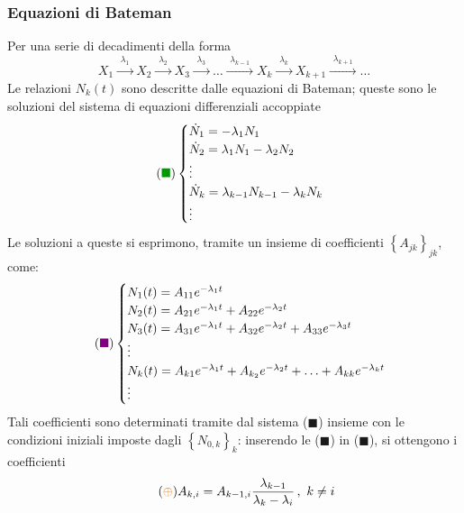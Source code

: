 \documentclass[11pt, a4paper]{scrartcl}
\theoremstyle{style}
\numberwithin{equation}{subsection}
\begin{document}
\subsubsection{Equazioni di Bateman}

Per una serie di decadimenti della forma
\[
	X_1 \xrightarrow{\ \, \lambda _1 \ \, } X_2 \xrightarrow{\ \, \lambda _2 \ \, } X_3 \xrightarrow{\ \, \lambda _3 \ \, } \ldots \xrightarrow{\ \, \lambda _{k-1} \ \, } X_k\xrightarrow{\ \, \lambda _k \ \, } X_{k+1}\xrightarrow{\ \, \lambda _{k+1} \ \, } \ldots
\] 
Le relazioni $N_k(t)$ sono descritte dalle equazioni di Bateman; queste sono le soluzioni del sistema di equazioni differenziali accoppiate 
\begin{equation}\tag{{\color{green!60!black}$\blacksquare$}}
	\begin{cases}
	\dot{N}_1 = - \lambda _1 N_1 \\
	\dot{N}_2 = \lambda _1 N_1 - \lambda _2 N_2\\
	\vdots\\
	\dot{N}_k = \lambda _{k-1}N_{k-1} - \lambda _k N_k\\
	\vdots
	\end{cases}
\end{equation}
Le soluzioni a queste si esprimono, tramite un insieme di coefficienti $\left\{ A_{jk} \right\} _{jk}$, come:
\begin{equation}\tag{{\color{violet}$\blacksquare$}}
	\begin{cases}
		N_1(t) = A_{11} e^{-\lambda _1 t}\\
		N_2(t) = A_{21} e^{-\lambda _1 t} + A_{22} e^{-\lambda _2 t} \\
		N_3(t) = A_{31} e^{-\lambda _1 t} + A_{32} e^{-\lambda _2 t} + A_{33} e^{-\lambda _3 t}\\
		\vdots\\
		N_k(t) = A_{k 1} e^{-\lambda _1 t} + A_{k_2} e^{-\lambda _2 t } + \ldots + A_{k k} e^{-\lambda _k t } \\
		\vdots
	\end{cases}
\end{equation}
Tali coefficienti sono determinati tramite dal sistema ({\color{green!60!black}$\blacksquare$}) insieme con le condizioni iniziali imposte dagli $\left\{ N_{0,k} \right\}_k $: inserendo le ({\color{violet}$\blacksquare$}) in ({\color{green!60!black}$\blacksquare$}), si ottengono i coefficienti
\begin{equation}\tag{{\color{orange}$\oplus$}}
	A_{k,i} = A_{k-1,i} \frac{\lambda _{k-1}}{\lambda _k - \lambda _i} \, , \ k\neq i
\end{equation}
\end{document}
